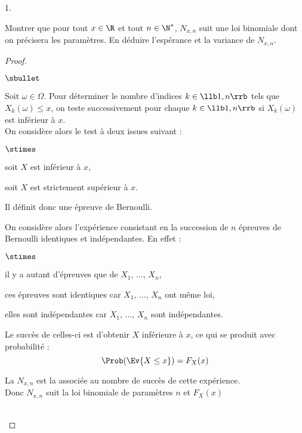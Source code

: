 \documentclass[11pt]{article}%
\begin{document}
\begin{noliste}{1.}
  \setlength{\itemsep}{4mm}
  \setcounter{enumi}{5}
  \item Montrer que pour tout $x \in \R$ et tout $n \in \N^*$, 
  $N_{x,n}$ suit une loi binomiale dont on précisera les 
  paramètres. En déduire l'espérance et la variance de $N_{x,n}$.
  
  \begin{proof}~
  \begin{noliste}{$\sbullet$}
    \item Soit $\omega \in \Omega$. Pour déterminer le nombre d'indices 
    $k \in \llb 1,n \rrb$ tels que $X_k(\omega) \leq x$, on teste 
    successivement pour chaque $k \in \llb 1, n \rrb$ si $X_k(\omega)$
    est inférieur à $x$.\\
    On considère alors le test à deux issues suivant :
    \begin{noliste}{$\stimes$}
      \item soit $X$ est inférieur à $x$,
      \item soit $X$ est strictement supérieur à $x$.
    \end{noliste}
    Il définit donc une épreuve de Bernoulli.
    
    \item On considère alors l'expérience consistant en la succession 
    de $n$ épreuves de Bernoulli identiques et indépendantes.
    En effet :
    \begin{noliste}{$\stimes$}
      \item il y a autant d'épreuves que de \var $X_1$, $\hdots$, $X_n$,
      \item ces épreuves sont identiques car $X_1$, $\hdots$, $X_n$ 
      ont même loi,
      \item elles sont indépendantes car $X_1$, $\hdots$, $X_n$ sont 
      indépendantes.
    \end{noliste}
    Le succès de celles-ci est d'obtenir $X$ inférieure 
    à $x$, ce qui se produit avec probabilité :
    \[
      \Prob(\Ev{X \leq x}) = F_X(x)
    \]
    \item La \var $N_{x,n}$ est la \var associée au nombre de 
    succès de cette expérience.\\
    Donc $N_{x,n}$ suit la loi binomiale de paramètres $n$ et $F_X(x)$
  \end{noliste}
  ~\\[-1cm]
  \end{proof}
  

\end{noliste}
\end{document}
